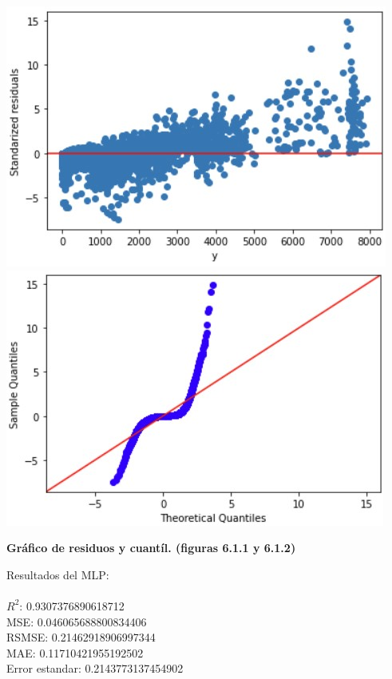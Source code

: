 \documentclass{article}
\begin{document}
                        \includegraphics[scale=0.6]{images/RFR_After_SS.jpg} 
                        \includegraphics[scale=0.6]{images/RFR_After_SS_Q.jpg} \\
                        \begin{center}
                            \textbf{Gráfico de residuos y cuantíl. (figuras 6.1.1 y 6.1.2)}
                        \end{center}
            
            Resultados del MLP:\\
                    \\  
                        $R^2$:  0.9307376890618712 \\
                        MSE:  0.046065688800834406 \\
                        RSMSE:  0.21462918906997344 \\
                        MAE:  0.11710421955192502 \\
                        Error estandar:  0.2143773137454902 \\
                
\end{document}
